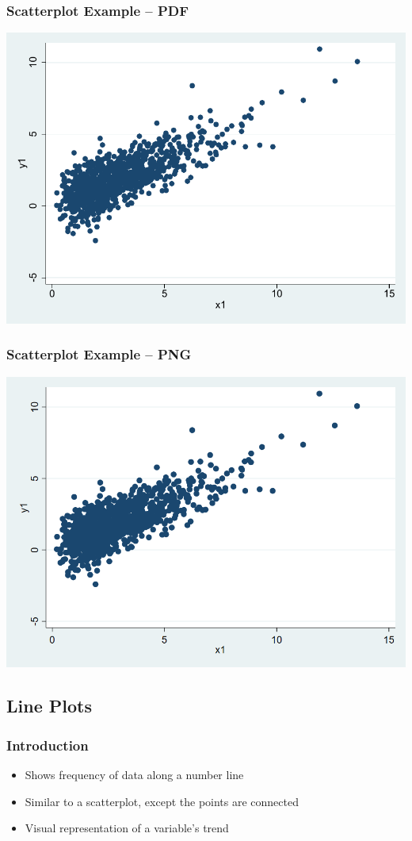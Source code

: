 \documentclass{beamer}
\begin{document}
\begin{frame}
	\frametitle{Scatterplot Example -- PDF}
		\includegraphics[scale=0.7]{DVgraph02a.pdf}
\end{frame}

\begin{frame}
	\frametitle{Scatterplot Example -- PNG}
		\includegraphics[scale=0.3]{DVgraph02a.png}
\end{frame}

\subsection{Line Plots}

\begin{frame}
	\frametitle{Introduction}
		\begin{itemize}
			\item Shows frequency of data along a number line
			\item Similar to a scatterplot, except the points are connected
			\item Visual representation of a variable's trend
		\end{itemize}
\end{frame}
\end{document}
